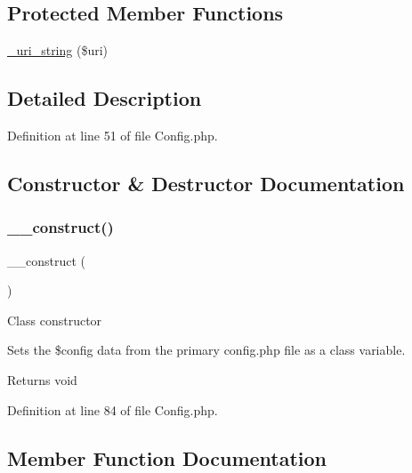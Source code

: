 \subsection*{Protected Member Functions}
\begin{DoxyCompactItemize}
\item 
\mbox{\hyperlink{class_c_i___config_a8a0a35d53f0904d9f655e82804b9998d}{\+\_\+uri\+\_\+string}} (\$uri)
\end{DoxyCompactItemize}


\subsection{Detailed Description}


Definition at line 51 of file Config.\+php.



\subsection{Constructor \& Destructor Documentation}
\mbox{\label{class_c_i___config_a095c5d389db211932136b53f25f39685}} 
\subsubsection{\texorpdfstring{\_\_construct()}{\_\_construct()}}
{\footnotesize\ttfamily \+\_\+\+\_\+construct (\begin{DoxyParamCaption}{ }\end{DoxyParamCaption})}

Class constructor

Sets the \$config data from the primary config.\+php file as a class variable.

\begin{DoxyReturn}{Returns}
void 
\end{DoxyReturn}


Definition at line 84 of file Config.\+php.



\subsection{Member Function Documentation}
\mbox{\label{class_c_i___config_a8a0a35d53f0904d9f655e82804b9998d}} 
